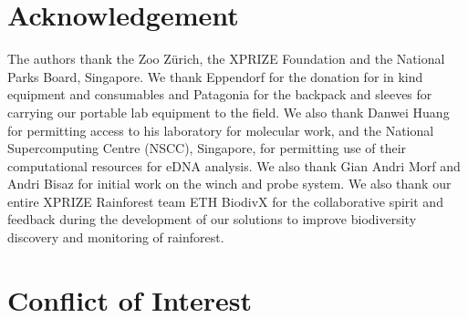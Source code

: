 \section{Acknowledgement}

The authors thank the Zoo Zürich, the XPRIZE Foundation and the National Parks Board, Singapore. We thank Eppendorf for the donation for in kind equipment and consumables and Patagonia for the backpack and sleeves for carrying our portable lab equipment to the field. We also thank Danwei Huang for permitting access to his laboratory for molecular work, and the National Supercomputing Centre (NSCC), Singapore, for permitting use of their computational resources for eDNA analysis. We also thank Gian Andri Morf and Andri Bisaz for initial work on the winch and probe system.  We also thank our entire XPRIZE Rainforest team ETH BiodivX for the collaborative spirit and feedback during the development of our solutions to improve biodiversity discovery and monitoring of rainforest.


\section*{Conflict of Interest}

